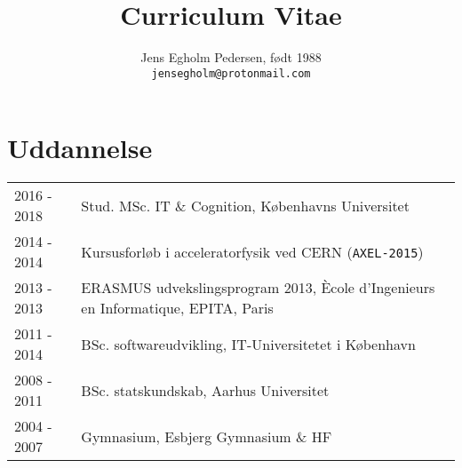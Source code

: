 \documentclass[12pt,a4paper,notitlepage]{article}
\author{Jens Egholm Pedersen, født 1988
\\ \texttt{jensegholm@protonmail.com}
}
\title{Curriculum Vitae}
\begin{document}
\maketitle

\section*{Uddannelse}
\begin{tabularx}{\textwidth}{l X}
2016 - 2018 & Stud. MSc. IT \& Cognition, Københavns Universitet \\
2014 - 2014 & Kursusforløb i acceleratorfysik ved CERN (\texttt{AXEL-2015}) \\
2013 - 2013 & ERASMUS udvekslingsprogram 2013,
              Ècole d'Ingenieurs en Informatique, EPITA, Paris \\
2011 - 2014 & BSc. softwareudvikling, IT-Universitetet i København \\
2008 - 2011 & BSc. statskundskab, Aarhus Universitet \\
2004 - 2007 & Gymnasium, Esbjerg Gymnasium \& HF
\end{tabularx}
\end{document}
